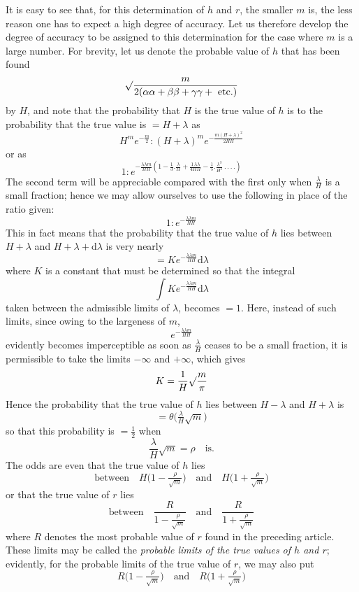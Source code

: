 It is easy to see that, for this determination of \(h\) and \(r\), the smaller \(m\) is, the less reason one has to expect a high degree of accuracy. Let us therefore develop the degree of accuracy to be assigned to this determination for the case where \(m\) is a large number. For brevity, let us denote the probable value of \(h\) that has been found
\[
\surd\frac{m}{2(\alpha\alpha+\beta\beta+\gamma\gamma+\text{ etc.})}
\]
by \(H\), and note that the probability that \(H\) is the
%
true value of \(h\) is to the probability that the true value is \(=H+\lambda\) as
\[
H^m e^{-\frac m2}:(H+\lambda)^m e^{-\frac{m(H+\lambda)^2}{2HH}}
\]
or as
\[
1:e^{-\frac{\lambda\lambda m}{HH}(1-\frac13.\frac\lambda H+\frac{1\,\lambda\lambda}{4HH}-\frac15.\frac{\lambda^3}{H^3}\, .\,.\,.\,.)}
\]
The second term will be appreciable compared with the first only when \(\frac\lambda H\) is a small fraction; hence we may allow ourselves to use the following in place of the ratio given:
\[
1:e^{-\frac{\lambda\lambda m}{HH}}
\]
This in fact means that the probability that the true value of \(h\) lies between \(H+\lambda\) and \(H+\lambda+\mathrm{d}\lambda\) is very nearly
\[
=Ke^{-\frac{\lambda\lambda m}{HH}}\mathrm{d}\lambda
\]
where \(K\) is a constant that must be determined so that the integral
\[
\int Ke^{-\frac{\lambda\lambda m}{HH}}\mathrm{d}\lambda
\]
taken between the admissible limits of \(\lambda\), becomes \(=1\). Here, instead of such limits, since owing to the largeness of \(m\),
\[
e^{-\frac{\lambda\lambda m}{HH}}
\]
evidently becomes imperceptible as soon as \(\frac\lambda H\) ceases to be a small fraction, it is permissible to take the limits \(-\infty\) and \(+\infty\), which gives
\[
K=\frac1H\surd\frac m\pi
\]
Hence the probability that the true value of \(h\) lies between \(H-\lambda\) and \(H+\lambda\) is
\[
=\theta\bigl(\tfrac\lambda H\surd m\bigr)
\]
so that this probability is \(=\frac12\) when
\[
\frac\lambda H\surd m=\rho\quad\text{is.}
\]
%
The odds are even that the true value of \(h\) lies
\[
\text{between}\quad H\bigl(1-\tfrac\rho{\surd m}\bigr)\quad\text{and}\quad H\bigl(1+\tfrac\rho{\surd m}\bigr)
\]
or that the true value of \(r\) lies
\[
\text{between}\quad\frac{R}{1-\frac\rho{\surd m}}\quad\text{and}\quad\frac{R}{1+\frac\rho{\surd m}}
\]
where \(R\) denotes the most probable value of \(r\) found in the preceding article. These limits may be called the \textit{probable limits of the true values of \(h\) and \(r\)}; evidently, for the probable limits of the true value of \(r\), we may also put
\[
R\bigl(1-\tfrac\rho{\surd m}\bigr)\quad\text{and}\quad R\bigl(1+\tfrac\rho{\surd m}\bigr)
\]

